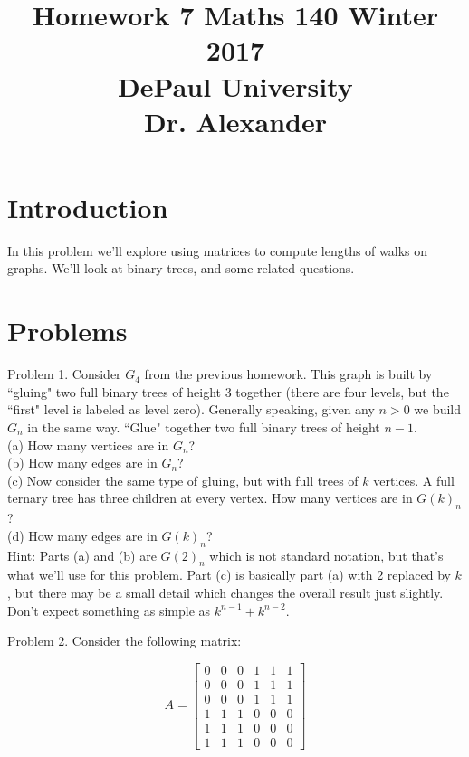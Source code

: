\documentclass[16 pt]{amsart}
\theoremstyle{definition}
\theoremstyle{remark}
\numberwithin{equation}{subsection}
\begin{document}
\title{Homework 7 Maths 140 Winter 2017 \\ DePaul University\\Dr. Alexander}
\maketitle

\section{Introduction}
In this problem we'll explore using matrices to compute lengths of walks on graphs.  We'll look at binary trees, and some related questions.

\section{Problems}

Problem 1.  Consider $G_4$ from the previous homework.  This graph is built by ``gluing" two full binary trees of height 3 together (there are four levels, but the ``first" level is labeled as level zero).  Generally speaking, given any $n>0$ we build $G_n$ in the same way.  ``Glue" together two full binary trees of height $n-1$.\\

(a) How many vertices are in $G_n$?\\

(b) How many edges are in $G_n$?\\

(c) Now consider the same type of gluing, but with full trees of $k$ vertices.  A full ternary tree has three children at every vertex.  How many vertices are in $G(k)_n$?\\

(d) How many edges are in $G(k)_n$?\\

Hint: Parts (a) and (b) are $G(2)_n$ which is not standard notation, but that's what we'll use for this problem.  Part (c) is basically part (a) with 2 replaced by $k$, but there may be a small detail which changes the overall result just slightly.  Don't expect something as simple as $k^{n-1} + k^{n-2}$.

\newpage

Problem 2. Consider the following matrix:

\[
A=
\begin{bmatrix}
0&0&0&1&1&1\\
0&0&0&1&1&1\\
0&0&0&1&1&1\\
1&1&1&0&0&0\\
1&1&1&0&0&0\\
1&1&1&0&0&0
\end{bmatrix}
\]
\end{document}
